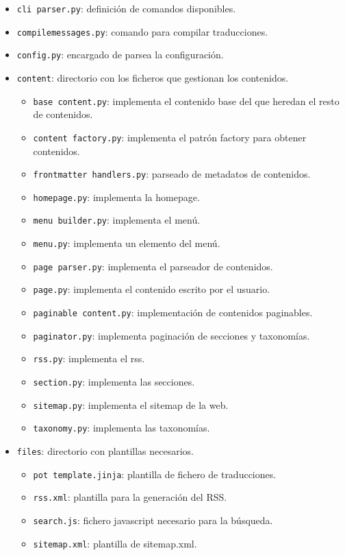 \begin{itemize}
\item \texttt{cli parser.py}: definición de comandos disponibles.
\item \texttt{compilemessages.py}: comando para compilar traducciones.
\item \texttt{config.py}: encargado de parsea la configuración.
\item \texttt{content}: directorio con los ficheros que gestionan los contenidos.
    \begin{itemize}
        \item \texttt{base content.py}: implementa el contenido base del que heredan el resto de contenidos.
       \item \texttt{content factory.py}: implementa el patrón factory para obtener contenidos.
       \item \texttt{frontmatter handlers.py}: parseado de metadatos de contenidos.
       \item \texttt{homepage.py}: implementa la homepage.
       \item \texttt{menu builder.py}: implementa el menú.
       \item \texttt{menu.py}: implementa un elemento del menú.
       \item \texttt{page parser.py}: implementa el parseador de contenidos.
       \item \texttt{page.py}: implementa el contenido escrito por el usuario.
       \item \texttt{paginable content.py}: implementación de contenidos paginables.
       \item \texttt{paginator.py}: implementa paginación de secciones y taxonomías.
       \item \texttt{rss.py}: implementa el rss.
       \item \texttt{section.py}: implementa las secciones.
       \item \texttt{sitemap.py}: implementa el sitemap de la web.
       \item \texttt{taxonomy.py}: implementa las taxonomías.
    \end{itemize}

\item \texttt{files}: directorio con plantillas necesarios.
    \begin{itemize}
        \item \texttt{pot template.jinja}: plantilla de fichero de traducciones.
       \item \texttt{rss.xml}: plantilla para la generación del RSS.
       \item \texttt{search.js}: fichero javascript necesario para la búsqueda.
       \item \texttt{sitemap.xml}: plantilla de sitemap.xml.
    \end{itemize}


\end{itemize}
